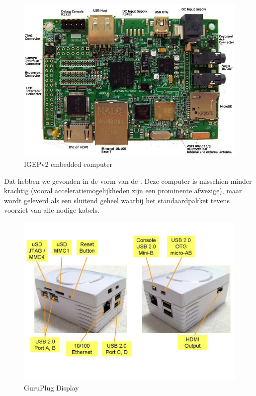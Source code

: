 \begin{figure}
	\includegraphics[width=\textwidth]{afbeeldingen/IGEPv2}
	\caption{IGEPv2 embedded computer}
\end{figure}

Dat hebben we gevonden in de vorm van de . Deze computer is misschien minder krachtig (vooral acceleratiemogelijkheden zijn een prominente afwezige), maar wordt geleverd als een sluitend geheel waarbij het standaardpakket tevens voorziet van alle nodige kabels.

\begin{figure}
	\includegraphics[width=\textwidth]{afbeeldingen/GuruPlug_Display}
	\caption{GuruPlug Display}
\end{figure}

